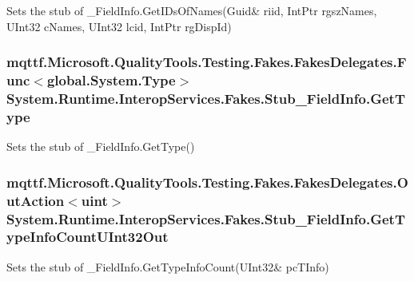 Sets the stub of \-\_\-\-Field\-Info.\-Get\-I\-Ds\-Of\-Names(Guid\& riid, Int\-Ptr rgsz\-Names, U\-Int32 c\-Names, U\-Int32 lcid, Int\-Ptr rg\-Disp\-Id)

\hypertarget{class_system_1_1_runtime_1_1_interop_services_1_1_fakes_1_1_stub___field_info_ae24d0020b0312495ead79c2c8e266a6d}{
\subsubsection[{Get\-Type}]{\setlength{\rightskip}{0pt plus 5cm}mqttf.\-Microsoft.\-Quality\-Tools.\-Testing.\-Fakes.\-Fakes\-Delegates.\-Func$<$global.\-System.\-Type$>$ System.\-Runtime.\-Interop\-Services.\-Fakes.\-Stub\-\_\-\-Field\-Info.\-Get\-Type}}\label{class_system_1_1_runtime_1_1_interop_services_1_1_fakes_1_1_stub___field_info_ae24d0020b0312495ead79c2c8e266a6d}


Sets the stub of \-\_\-\-Field\-Info.\-Get\-Type()

\hypertarget{class_system_1_1_runtime_1_1_interop_services_1_1_fakes_1_1_stub___field_info_a403fba1897341f1395e7f2c5dcda2dab}{
\subsubsection[{Get\-Type\-Info\-Count\-U\-Int32\-Out}]{\setlength{\rightskip}{0pt plus 5cm}mqttf.\-Microsoft.\-Quality\-Tools.\-Testing.\-Fakes.\-Fakes\-Delegates.\-Out\-Action$<$uint$>$ System.\-Runtime.\-Interop\-Services.\-Fakes.\-Stub\-\_\-\-Field\-Info.\-Get\-Type\-Info\-Count\-U\-Int32\-Out}}\label{class_system_1_1_runtime_1_1_interop_services_1_1_fakes_1_1_stub___field_info_a403fba1897341f1395e7f2c5dcda2dab}


Sets the stub of \-\_\-\-Field\-Info.\-Get\-Type\-Info\-Count(U\-Int32\& pc\-T\-Info)

